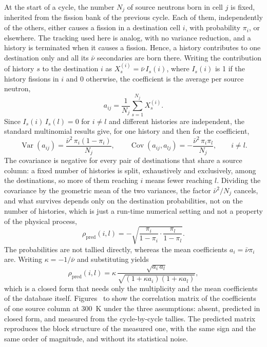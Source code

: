 At the start of a cycle, the number $N_j$ of source neutrons born in cell $j$ is
fixed, inherited from the fission bank of the previous cycle. Each of them,
independently of the others, either causes a fission in a destination cell $i$,
with probability $\pi_i$, or elsewhere. The tracking used here is analog, with
no variance reduction, and a history is terminated when it causes a fission.
Hence, a history contributes to one destination only and all its $\bar\nu$ secondaries
are born there. Writing the contribution of history $s$ to the destination $i$
as $X^{(i)}_s = \bar\nu\,I_s(i)$, where $I_s(i)$ is 1 if the history fissions
in $i$ and 0 otherwise, the coefficient is the average per source neutron,
%
\begin{equation}
  a_{ij} = \frac{1}{N_j}\sum_{s=1}^{N_j} X^{(i)}_s .
  \label{cr:eq:aij}
\end{equation}
%
Since $I_s(i)\,I_s(l) = 0$ for $i\neq l$ and different histories are
independent, the standard multinomial results \cite{CasellaBerger2002} give,
for one history and then for the coefficient,
%
\begin{equation}
  \operatorname{Var}(a_{ij}) = \frac{\bar\nu^2\,\pi_i(1-\pi_i)}{N_j},
  \qquad
  \operatorname{Cov}(a_{ij},a_{lj}) = -\frac{\bar\nu^2\,\pi_i\pi_l}{N_j},
  \qquad i\neq l .
  \label{cr:eq:multinomial}
\end{equation}
%
The covariance is negative for every pair of destinations that share a source
column: a fixed number of histories is split,
exhaustively and exclusively, among the destinations, so more of them reaching
$i$ means fewer reaching $l$. Dividing the covariance by the geometric mean of
the two variances, the factor $\bar\nu^2/N_j$ cancels, and what survives
depends only on the destination probabilities, not on the number of histories,
which is just a run-time numerical setting and not a property of the physical
process,
%
\begin{equation}
  \rho_{\mathrm{pred}}(i,l) = -\sqrt{\frac{\pi_i}{1-\pi_i}\cdot\frac{\pi_l}{1-\pi_l}} .
  \label{cr:eq:rho-pi}
\end{equation}
%
The probabilities are not tallied directly, whereas the mean coefficients
$a_i = \bar\nu\pi_i$ are. Writing $\kappa=-1/\bar\nu$ and substituting yields
%
\begin{equation}
  \rho_{\mathrm{pred}}(i,l) = \kappa\,
  \frac{\sqrt{a_i\,a_l}}{\sqrt{(1+\kappa a_i)(1+\kappa a_l)}},
  \label{cr:eq:rho-pred}
\end{equation}
%
which is a closed form that needs only the multiplicity and the mean coefficients of the
database itself. Figures~ to  show
the correlation matrix of the coefficients of one source column at
\SI{300}{K} under the three assumptions: absent, predicted in closed form, and
measured from the cycle-by-cycle tallies. The predicted matrix reproduces the
block structure of the measured one, with the same sign and the same order of
magnitude, and without its statistical noise.

